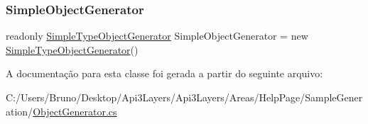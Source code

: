 \subsubsection{\texorpdfstring{Simple\+Object\+Generator}{SimpleObjectGenerator}}
{\footnotesize\ttfamily readonly \hyperlink{classApi3Layers_1_1Areas_1_1HelpPage_1_1ObjectGenerator_1_1SimpleTypeObjectGenerator}{Simple\+Type\+Object\+Generator} Simple\+Object\+Generator = new \hyperlink{classApi3Layers_1_1Areas_1_1HelpPage_1_1ObjectGenerator_1_1SimpleTypeObjectGenerator}{Simple\+Type\+Object\+Generator}()\hspace{0.3cm}{\ttfamily [private]}}



A documentação para esta classe foi gerada a partir do seguinte arquivo\+:\begin{DoxyCompactItemize}
\item 
C\+:/\+Users/\+Bruno/\+Desktop/\+Api3\+Layers/\+Api3\+Layers/\+Areas/\+Help\+Page/\+Sample\+Generation/\hyperlink{ObjectGenerator_8cs}{Object\+Generator.\+cs}\end{DoxyCompactItemize}

